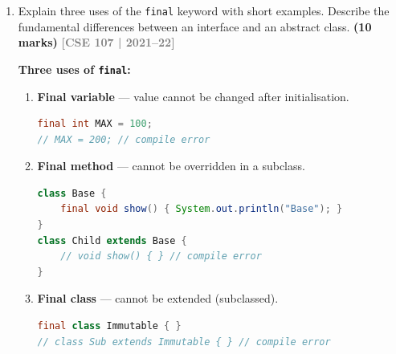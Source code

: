 \documentclass[12pt,a3paper]{article}
\newcommand{\yr}[1]{\hfill\textcolor{gray}{\small\textbf{[#1]}}}
\newcommand{\mk}[1]{\textcolor{orange!70!black}{\small\textbf{(#1 marks)}}}
\begin{document}
\begin{enumerate}
\begin{tcolorbox}[enhanced,breakable,ansbox,
  colback=cD!4,colframe=cD,boxrule=0.8pt,arc=5pt,
  title={\textbf{Answer --- Minimum Code for \texttt{c2}}},
  fonttitle=\bfseries\color{white},colbacktitle=cD]
\textit{Note: \texttt{f1()} has a \texttt{default} body in \texttt{i1},
so \texttt{c2} need not override it. \texttt{f6()} is \texttt{final}
in \texttt{c1} --- already implemented, cannot be overridden.}

\begin{lstlisting}[language=Java]
class c2 extends c1 implements i2 {
    @Override public void f2() { }   // from i1 (abstract)
    @Override void f5() { }          // from c1 (abstract)
    @Override public void f3() { }   // from i2
    @Override public void f4() { }   // from i2
}
\end{lstlisting}

\end{tcolorbox}

\item Explain three uses of the \texttt{final} keyword with short examples. Describe the fundamental differences between an interface and an abstract class. \mk{10}
\yr{CSE 107 | 2021--22}

\begin{tcolorbox}[enhanced,breakable,ansbox,
  colback=cD!4,colframe=cD,boxrule=0.8pt,arc=5pt,
  title={\textbf{Answer --- \texttt{final} Keyword (3 Uses) \& Interface vs.\ Abstract Class}},
  fonttitle=\bfseries\color{white},colbacktitle=cD]

\textbf{Three uses of \texttt{final}:}

\begin{enumerate}[label=\textbf{\arabic*.}]
  \item \textbf{Final variable} --- value cannot be changed after initialisation.
\begin{lstlisting}[language=Java]
final int MAX = 100;
// MAX = 200; // compile error
\end{lstlisting}

  \item \textbf{Final method} --- cannot be overridden in a subclass.
\begin{lstlisting}[language=Java]
class Base {
    final void show() { System.out.println("Base"); }
}
class Child extends Base {
    // void show() { } // compile error
}
\end{lstlisting}

  \item \textbf{Final class} --- cannot be extended (subclassed).
\begin{lstlisting}[language=Java]
final class Immutable { }
// class Sub extends Immutable { } // compile error
\end{lstlisting}
\end{enumerate}


\end{tcolorbox}
\end{enumerate}
\end{document}
